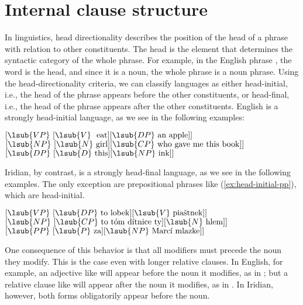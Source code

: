 \section{Internal clause structure}\label{sec:internal-clause-structure}

In linguistics, head directionality describes the position of the head of a
phrase with relation to other constituents. The {\sc head} is the element that
determines the syntactic category of the whole phrase. For example, in the
English phrase , the word  is the head, and
since it is a noun, the whole phrase is a noun phrase. Using the
head-directionality criteria, we can classify languages as either head-initial,
i.e., the head of the phrase appears before the other constituents, or
head-final, i.e., the head of the phrase appears after the other constituents.
English is a strongly head-initial language, as we see in the following
examples:

\pex
\a \([{}\lsub{VP}~[{}\lsub{V}~\text{ eat}] [{}\lsub{DP}~\text{an apple}]]\)
\a \([{}\lsub{NP}~[{}\lsub{N}~\text{girl}] [{}\lsub{CP}~\text{who gave me this book}]]\)
\a \([{}\lsub{DP}~[{}\lsub{D}~\text{this}] [{}\lsub{NP}~\text{ink}]]\)
\xe

Iridian, by contrast, is a strongly head-final language, as we see in the
following examples. The only exception are prepositional phrases like
(\ref{ex:head-initial-pp}), which are head-initial.

\pex
\a \([{}\lsub{VP}~[{}\lsub{DP}~\text{to lobek}] [{}\lsub{V}~\text{piaštnek}]]\)\\
\a \([{}\lsub{NP}~[{}\lsub{CP}~\text{to tóm dítnice ty}] [{}\lsub{N}~\text{hlem}] ]\)\\
\a\label{ex:head-initial-pp}\([{}\lsub{PP}~[{}\lsub{P}~\text{za}] [{}\lsub{NP}~\text{Marcí mlazke}] ]\)\\
\xe

One consequence of this behavior is that all modifiers must precede the noun
they modify. This is the case even with longer relative clauses. In English, for
example, an adjective like  will appear before the noun it modifies,
as in ; but a relative clause like  will appear after the noun it modifies, as in . In Iridian, however, both forms obligatorily appear before
the noun.

